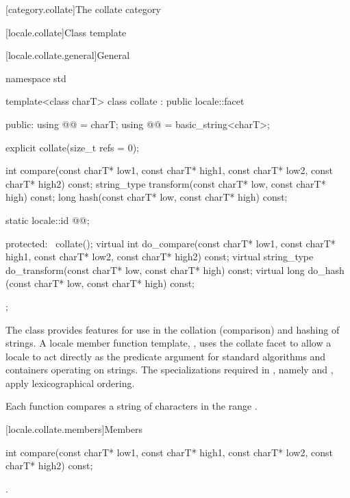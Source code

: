 [category.collate]{The collate category}

[locale.collate]{Class template }

[locale.collate.general]{General}

%
\begin{codeblock}
namespace std {
  template<class charT>
  class collate : public locale::facet {
  public:
    using @@   = charT;
    using @@ = basic_string<charT>;

    explicit collate(size_t refs = 0);

    int compare(const charT* low1, const charT* high1,
                const charT* low2, const charT* high2) const;
    string_type transform(const charT* low, const charT* high) const;
    long hash(const charT* low, const charT* high) const;

    static locale::id @@;

  protected:
    ~collate();
    virtual int do_compare(const charT* low1, const charT* high1,
                           const charT* low2, const charT* high2) const;
    virtual string_type do_transform(const charT* low, const charT* high) const;
    virtual long do_hash (const charT* low, const charT* high) const;
  };
}
\end{codeblock}

\pnum
The class  provides features
for use in the collation (comparison) and hashing of strings.
A locale member function template, ,
uses the collate facet to allow a locale to act directly as
the predicate argument for standard algorithms and
containers operating on strings.
The specializations
required in ,
namely  and ,
apply lexicographical ordering.

\pnum
Each function compares a string of characters 
in the range .

[locale.collate.members]{Members}

%
\begin{itemdecl}
int compare(const charT* low1, const charT* high1,
            const charT* low2, const charT* high2) const;
\end{itemdecl}

\begin{itemdescr}
\pnum
\returns
{}.
\end{itemdescr}

